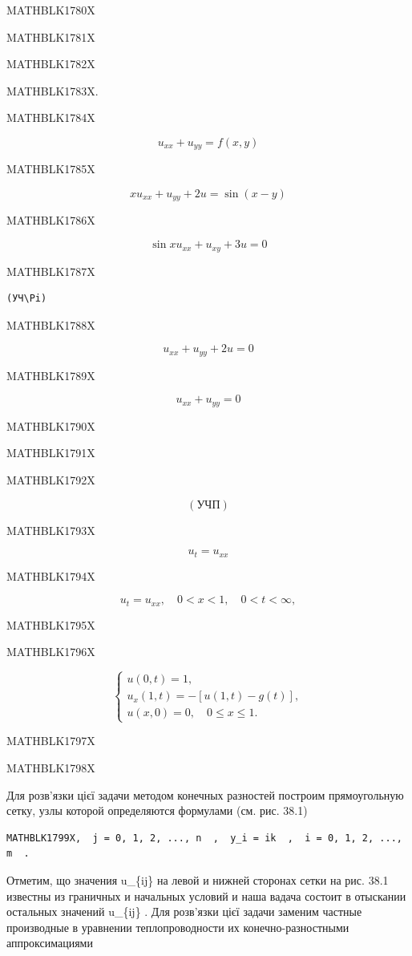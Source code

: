 \documentclass[
  ukrainian,
]{article}
\begin{document}
MATHBLK1780X

MATHBLK1781X

MATHBLK1782X

MATHBLK1783X.

MATHBLK1784X

\[
u_{xx} + u_{yy} = f(x, y)
\]

MATHBLK1785X

\[
xu_{xx} + u_{yy} + 2u = \sin(x - y)
\]

MATHBLK1786X

\[
\sin xu_{xx} + u_{xy} + 3u = 0
\]

MATHBLK1787X

\begin{verbatim}
(УЧ\Pi)
\end{verbatim}

MATHBLK1788X

\[
u_{xx} + u_{yy} + 2u = 0
\]

MATHBLK1789X

\[
u_{xx} + u_{yy} = 0
\]

MATHBLK1790X

MATHBLK1791X

MATHBLK1792X

\[
(\text{УЧП})
\]

MATHBLK1793X

\[
u_t = u_{xx}
\]

MATHBLK1794X

\[
u_t = u_{xx}, \quad 0 < x < 1, \quad 0 < t < \infty,
\]

MATHBLK1795X

MATHBLK1796X

\[
\begin{cases} u(0, t) = 1, \\ u_x(1, t) = -[u(1, t) - g(t)], \\ u(x, 0) = 0, \quad 0 \le x \le 1. \end{cases}
\]

MATHBLK1797X

MATHBLK1798X

Для розв'язки цієї задачи методом конечных разностей построим
прямоугольную сетку, узлы которой определяются формулами (см. рис. 38.1)

\begin{verbatim}
MATHBLK1799X,  j = 0, 1, 2, ..., n  ,  y_i = ik  ,  i = 0, 1, 2, ..., m  .
\end{verbatim}

Отметим, що значения u\_\{ij\} на левой и нижней сторонах сетки на рис.
38.1 известны из граничных и начальных условий и наша вадача состоит в
отыскании остальных значений u\_\{ij\} . Для розв'язки цієї задачи
заменим частные производные в уравнении теплопроводности их
конечно-разностными аппроксимациями
\end{document}

